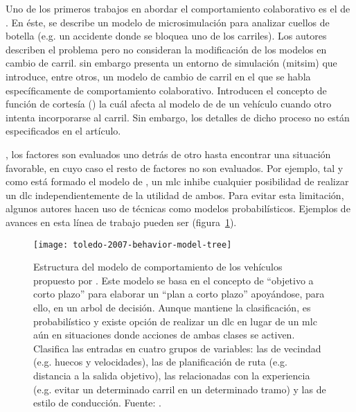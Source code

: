 Uno de los primeros trabajos en abordar el comportamiento colaborativo es el de \cite{Fritzsche1994}. En éste, se describe un modelo de microsimulación para analizar cuellos de botella (e.g. un accidente donde se bloquea uno de los carriles). Los autores describen el problema pero no consideran la modificación de los modelos en cambio de carril. \cite{Yang1996} sin embargo presenta un entorno de simulación (\gls{mitsim}) que introduce, entre otros, un modelo de cambio de carril en el que se habla específicamente de comportamiento colaborativo. Introducen el concepto de función de cortesía (\textit{}) la cuál afecta al modelo de \textit{} de un vehículo cuando otro intenta incorporarse al carril. Sin embargo, los detalles de dicho proceso no están especificados en el artículo.

\marginnote{

}

, los factores son evaluados uno detrás de otro hasta encontrar una situación favorable, en cuyo caso el resto de factores no son evaluados. Por ejemplo, tal y como está formado el modelo de \cite{Hidas2002}, un \gls{mlc} inhibe cualquier posibilidad de realizar un \gls{dlc} independientemente de la utilidad de ambos. Para evitar esta limitación, algunos autores hacen uso de técnicas como modelos probabilísticos. Ejemplos de avances en esta línea de trabajo pueden ser \cite{Toledo2003, Toledo2007, Wei2000} (figura~\ref{fig:toledo-2007-behavior-model-tree}).

\begin{figure}
	\texttt{[image: toledo-2007-behavior-model-tree]}
	\caption{Estructura del modelo de comportamiento de los vehículos propuesto por \cite{Toledo2007}. Este modelo se basa en el concepto de \enquote{objetivo a corto plazo} para elaborar un \enquote{plan a corto plazo} apoyándose, para ello, en un arbol de decisión. Aunque mantiene la clasificación, es probabilístico y existe opción de realizar un \gls{dlc} en lugar de un \gls{mlc} aún en situaciones donde acciones de ambas clases se activen. Clasifica las entradas en cuatro grupos de variables: las de vecindad (e.g. huecos y velocidades), las de planificación de ruta (e.g. distancia a la salida objetivo), las relacionadas con la experiencia (e.g. evitar un determinado carril en un determinado tramo) y las de estilo de conducción. Fuente: \cite{Toledo2007}.}
	\label{fig:toledo-2007-behavior-model-tree}
\end{figure}


